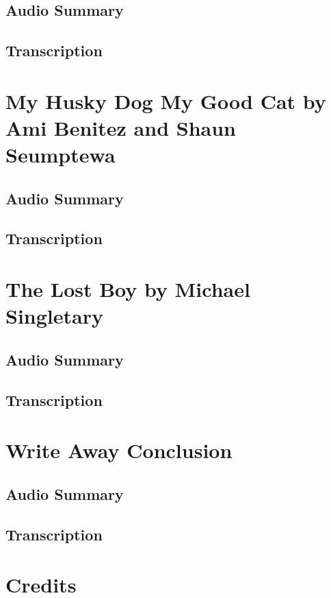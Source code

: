 \subsection{Audio Summary}

\subsection{Transcription}

\section{My Husky Dog My Good Cat by Ami Benitez and Shaun Seumptewa}

\subsection{Audio Summary}

\subsection{Transcription}

\section{The Lost Boy by Michael Singletary}

\subsection{Audio Summary}

\subsection{Transcription}

\section{Write Away Conclusion}

\subsection{Audio Summary}

\subsection{Transcription}

\section{Credits}